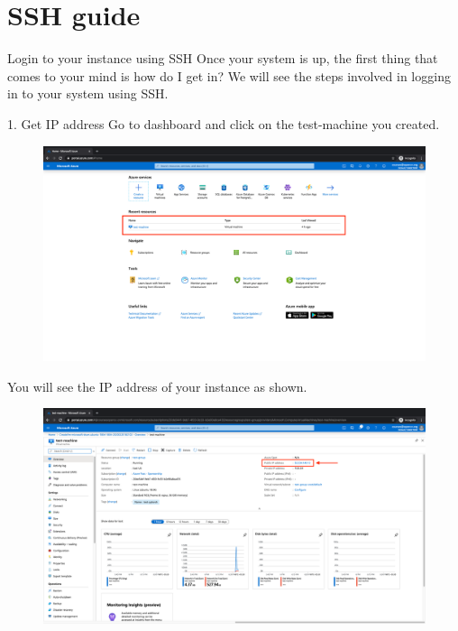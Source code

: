 \clearpage
{}
\setcounter{page}{1}

\pagestyle{fancy}

\section{SSH guide}
\label{appendix:ssh}

Login to your instance using SSH
Once your system is up, the first thing that comes to your mind is how do I get in? We will see the steps involved in logging in to your system using SSH.

1. Get IP address
Go to dashboard and click on the test-machine you created.

\begin{figure}[H]
\begin{center} 
\includegraphics[scale=0.20]{figures/ssh1}
\end{center}
\end{figure}

You will see the IP address of your instance as shown.

\begin{figure}[H]
\begin{center} 
\includegraphics[scale=0.20]{figures/ssh2}
\end{center}
\end{figure}

